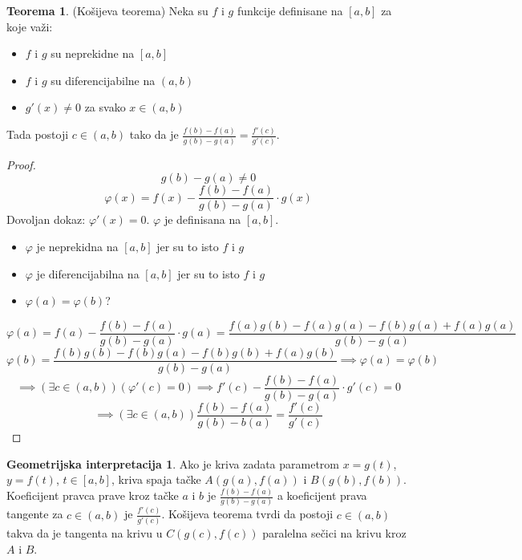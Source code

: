 \documentclass{article}
\theoremstyle{definition}
\newtheorem{ginterpretation}{Geometrijska interpretacija}[section]
\newtheorem{theorem}{Teorema}[section]
\begin{document}
        \begin{theorem}
            (Košijeva teorema) Neka su $f$ i $g$ funkcije definisane na $[a, b]$ za koje važi:
            \begin{itemize}
                \item $f$ i $g$ su neprekidne na $[a, b]$
                \item $f$ i $g$ su diferencijabilne na $(a, b)$
                \item $g'(x) \neq 0$ za svako $x \in (a, b)$
            \end{itemize}
            Tada postoji $c \in (a, b)$ tako da je $\frac{f(b) - f(a)}{g(b) - g(a)} = \frac{f'(c)}{g'(c)}$.
        \end{theorem}
        \begin{proof}
            $$g(b) - g(a) \neq 0$$
            $$\varphi(x) = f(x) - \frac{f(b) - f(a)}{g(b) - g(a)} \cdot g(x)$$
            Dovoljan dokaz: $\varphi'(x) = 0$. $\varphi$ je definisana na $[a, b]$.
            \begin{itemize}
                \item $\varphi$ je neprekidna na $[a, b]$ jer su to isto $f$ i $g$
                \item $\varphi$ je diferencijabilna na $[a, b]$ jer su to isto $f$ i $g$
                \item $\varphi(a) = \varphi(b)$?
            \end{itemize}
            $$\varphi(a) = f(a) - \frac{f(b) - f(a)}{g(b) - g(a)} \cdot g(a) = \frac{f(a)g(b) - f(a)g(a) - f(b)g(a) + f(a)g(a)}{g(b) - g(a)}$$
            $$\varphi(b) = \frac{f(b)g(b) - f(b)g(a) - f(b)g(b) + f(a)g(b)}{g(b) - g(a)} \implies \varphi(a) = \varphi(b)$$
            $$\implies (\exists c \in (a, b))(\varphi'(c) = 0) \implies f'(c) - \frac{f(b) - f(a)}{g(b) - g(a)} \cdot g'(c) = 0$$
            $$\implies (\exists c \in (a, b)) \frac{f(b) - f(a)}{g(b) - b(a)} = \frac{f'(c)}{g'(c)}$$
        \end{proof}
        \begin{ginterpretation}
            Ako je kriva zadata parametrom $x = g(t)$, $y = f(t)$, $t \in [a, b]$, kriva spaja tačke $A(g(a), f(a))$ i $B(g(b), f(b))$. Koeficijent pravca prave kroz tačke $a$ i $b$ je $\frac{f(b) - f(a)}{g(b) - g(a)}$ a koeficijent prava tangente za $c \in (a, b)$ je $\frac{f'(c)}{g'(c)}$. Košijeva teorema tvrdi da postoji $c \in (a, b)$ takva da je tangenta na krivu u $C(g(c), f(c))$ paralelna sečici na krivu kroz $A$ i $B$.
        \end{ginterpretation}
\end{document}
